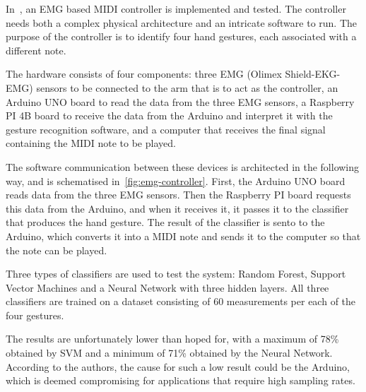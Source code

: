In~\cite{emg-midi-controller}, an EMG based MIDI controller is implemented and tested.
The controller needs both a complex physical architecture and an intricate software to run.
The purpose of the controller is to identify four hand gestures, each associated with a different note.

The hardware consists of four components:
three EMG (Olimex Shield-EKG-EMG) sensors to be connected to the arm that is to act as the controller,
an Arduino UNO board to read the data from the three EMG sensors,
a Raspberry PI 4B board to receive the data from the Arduino and interpret it with the gesture recognition software,
and a computer that receives the final signal containing the MIDI note to be played.

The software communication between these devices is architected in the following way,
and is schematised in~\autoref{fig:emg-controller}.
First, the Arduino UNO board reads data from the three EMG sensors.
Then the Raspberry PI board requests this data from the Arduino, and when it receives it,
it passes it to the classifier that produces the hand gesture.
The result of the classifier is sento to the Arduino,
which converts it into a MIDI note and sends it to the computer so that the note can be played.

Three types of classifiers are used to test the system: Random Forest,
Support Vector Machines and a Neural Network with three hidden layers.
All three classifiers are trained on a dataset consisting of 60 measurements per each of the four gestures.

The results are unfortunately lower than hoped for,
with a maximum of 78\% obtained by SVM and a minimum of 71\% obtained by the Neural Network.
According to the authors, the cause for such a low result could be the Arduino,
which is deemed compromising for applications that require high sampling rates.

